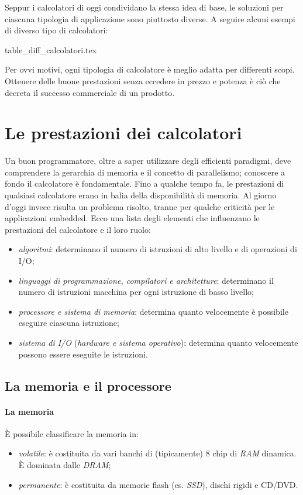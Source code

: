 \documentclass[class=book, crop=false, oneside]{standalone}
\begin{document}
Seppur i calcolatori di oggi condividano la stessa idea di base, le soluzioni per ciascuna tipologia di applicazione sono piuttosto diverse.
A seguire alcuni esempi di diverso tipo di calcolatori:

\begin{table}[H]
	\centering
	{table_diff_calcolatori.tex}
\end{table}

Per ovvi motivi, ogni tipologia di calcolatore è meglio adatta per differenti scopi.
Ottenere delle buone prestazioni senza eccedere in prezzo e potenza è ciò che decreta il successo commerciale di un prodotto.

\section{Le prestazioni dei calcolatori}

Un buon programmatore, oltre a saper utilizzare degli efficienti paradigmi, deve comprendere la gerarchia di memoria e il concetto di parallelismo; conoscere a fondo il calcolatore è fondamentale.
Fino a qualche tempo fa, le prestazioni di qualsiasi calcolatore erano in balia della disponibilità di memoria.
Al giorno d'oggi invece risulta un problema risolto, tranne per qualche criticità per le applicazioni embedded.
Ecco una lista degli elementi che influenzano le prestazioni del calcolatore e il loro ruolo:
\begin{itemize}[noitemsep]
	\item \emph{algoritmi}: determinano il numero di istruzioni di alto livello e di operazioni di I/O;
	\item \emph{linguaggi di programmazione, compilatori e architetture}: determinano il numero di istruzioni macchina per ogni istruzione di basso livello;
	\item \emph{processore e sistema di memoria}: determina quanto velocemente è possibile eseguire ciascuna istruzione;
	\item \emph{sistema di I/O} (\emph{hardware e sistema operativo}): determina quanto velocemente possono essere eseguite le istruzioni.
\end{itemize}

\subsection{La memoria e il processore}

\paragraph*{La memoria}
\`{E} possibile classificare la memoria in:
\begin{itemize}[noitemsep]
	\item \emph{volatile}: è costituita da vari banchi di (tipicamente) \(8\) chip di \emph{RAM} dinamica. \`{E} dominata dalle \emph{DRAM};
	\item \emph{permanente}: è costituita da memorie flash (es. \emph{SSD}), dischi rigidi e CD/DVD.
\end{itemize}
\end{document}
